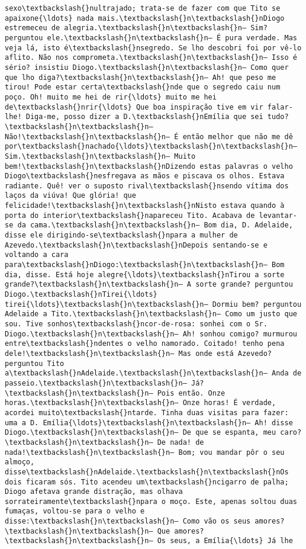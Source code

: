 \documentclass[11pt]{article}
\begin{document}
\begin{Verbatim}[commandchars=\\\{\}]
sexo\textbackslash{}nultrajado; trata-se de fazer com que Tito se apaixone{\ldots} nada mais.\textbackslash{}n\textbackslash{}nDiogo estremeceu de alegria.\textbackslash{}n\textbackslash{}n— Sim? perguntou ele.\textbackslash{}n\textbackslash{}n— É pura verdade. Mas veja lá, isto é\textbackslash{}nsegredo. Se lho descobri foi por vê-lo aflito. Não nos comprometa.\textbackslash{}n\textbackslash{}n— Isso é sério? insistiu Diogo.\textbackslash{}n\textbackslash{}n— Como quer que lho diga?\textbackslash{}n\textbackslash{}n— Ah! que peso me tirou! Pode estar certa\textbackslash{}nde que o segredo caiu num poço. Oh! muito me hei de rir{\ldots} muito me hei de\textbackslash{}nrir{\ldots} Que boa inspiração tive em vir falar-lhe! Diga-me, posso dizer a D.\textbackslash{}nEmília que sei tudo?\textbackslash{}n\textbackslash{}n— Não!\textbackslash{}n\textbackslash{}n— É então melhor que não me dê por\textbackslash{}nachado{\ldots}\textbackslash{}n\textbackslash{}n— Sim.\textbackslash{}n\textbackslash{}n— Muito bem!\textbackslash{}n\textbackslash{}nDizendo estas palavras o velho Diogo\textbackslash{}nesfregava as mãos e piscava os olhos. Estava radiante. Quê! ver o suposto rival\textbackslash{}nsendo vítima dos laços da viúva! Que glória! que felicidade!\textbackslash{}n\textbackslash{}nNisto estava quando à porta do interior\textbackslash{}napareceu Tito. Acabava de levantar-se da cama.\textbackslash{}n\textbackslash{}n— Bom dia, D. Adelaide, disse ele dirigindo-se\textbackslash{}npara a mulher de Azevedo.\textbackslash{}n\textbackslash{}nDepois sentando-se e voltando a cara para\textbackslash{}nDiogo:\textbackslash{}n\textbackslash{}n— Bom dia, disse. Está hoje alegre{\ldots}\textbackslash{}nTirou a sorte grande?\textbackslash{}n\textbackslash{}n— A sorte grande? perguntou Diogo.\textbackslash{}nTirei{\ldots} tirei{\ldots}\textbackslash{}n\textbackslash{}n— Dormiu bem? perguntou Adelaide a Tito.\textbackslash{}n\textbackslash{}n— Como um justo que sou. Tive sonhos\textbackslash{}ncor-de-rosa: sonhei com o Sr. Diogo.\textbackslash{}n\textbackslash{}n— Ah! sonhou comigo? murmurou entre\textbackslash{}ndentes o velho namorado. Coitado! tenho pena dele!\textbackslash{}n\textbackslash{}n— Mas onde está Azevedo? perguntou Tito a\textbackslash{}nAdelaide.\textbackslash{}n\textbackslash{}n— Anda de passeio.\textbackslash{}n\textbackslash{}n— Já?\textbackslash{}n\textbackslash{}n— Pois então. Onze horas.\textbackslash{}n\textbackslash{}n— Onze horas! É verdade, acordei muito\textbackslash{}ntarde. Tinha duas visitas para fazer: uma a D. Emília{\ldots}\textbackslash{}n\textbackslash{}n— Ah! disse Diogo.\textbackslash{}n\textbackslash{}n— De que se espanta, meu caro?\textbackslash{}n\textbackslash{}n— De nada! de nada!\textbackslash{}n\textbackslash{}n— Bom; vou mandar pôr o seu almoço, disse\textbackslash{}nAdelaide.\textbackslash{}n\textbackslash{}nOs dois ficaram sós. Tito acendeu um\textbackslash{}ncigarro de palha; Diogo afetava grande distração, mas olhava sorrateiramente\textbackslash{}npara o moço. Este, apenas soltou duas fumaças, voltou-se para o velho e disse:\textbackslash{}n\textbackslash{}n— Como vão os seus amores?\textbackslash{}n\textbackslash{}n— Que amores?\textbackslash{}n\textbackslash{}n— Os seus, a Emília{\ldots} Já lhe 
\end{Verbatim}
\end{document}
